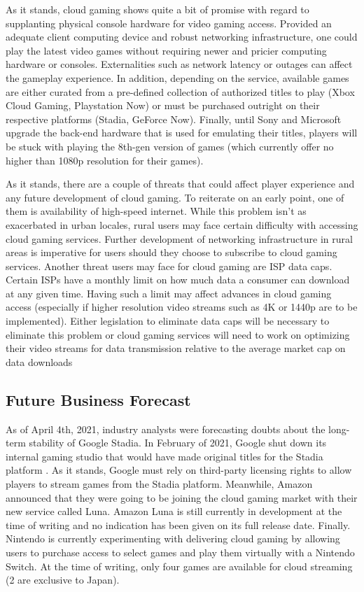 \documentclass[titlepage, 12pt]{article}
\begin{document}
As it stands, cloud gaming shows quite a bit of promise with regard to supplanting physical console hardware for video gaming access. Provided an adequate client computing device and robust networking infrastructure, one could play the latest video games without requiring newer and pricier computing hardware or consoles. Externalities such as network latency or outages can affect the gameplay experience. In addition, depending on the service, available games are either curated from a pre-defined collection of authorized titles to play (Xbox Cloud Gaming, Playstation Now) or must be purchased outright on their respective platforms (Stadia, GeForce Now). Finally, until Sony and Microsoft upgrade the back-end hardware that is used for emulating their titles, players will be stuck with playing the 8th-gen version of games (which currently offer no higher than 1080p resolution for their games).

As it stands, there are a couple of threats that could affect player experience and any future development of cloud gaming. To reiterate on an early point, one of them is availability of high-speed internet. While this problem isn’t as exacerbated in urban locales, rural users may face certain difficulty with accessing cloud gaming services. Further development of networking infrastructure in rural areas is imperative for users should they choose to subscribe to cloud gaming services. Another threat users may face for cloud gaming are ISP data caps. Certain ISPs have a monthly limit on how much data a consumer can download at any given time. Having such a limit may affect advances in cloud gaming access (especially if higher resolution video streams such as 4K or 1440p are to be implemented). Either legislation to eliminate data caps will be necessary to eliminate this problem or cloud gaming services will need to work on optimizing their video streams for data transmission relative to the average market cap on data downloads
	
	\subsection{Future Business Forecast}
	
	As of April 4th, 2021, industry analysts were forecasting doubts about the long-term stability of Google Stadia. In February of 2021, Google shut down its internal gaming studio that would have made original titles for the Stadia platform \citep{techcrunch}. As it stands, Google must rely on third-party licensing rights to allow players to stream games from the Stadia platform. Meanwhile, Amazon announced that they were going to be joining the cloud gaming market with their new service called Luna. Amazon Luna is still currently in development at the time of writing and no indication has been given on its full release date. Finally. Nintendo is currently experimenting with delivering cloud gaming by allowing users to purchase access to select games and play them virtually with a Nintendo Switch. At the time of writing, only four games are available for cloud streaming (2 are exclusive to Japan).
	
\end{document}
